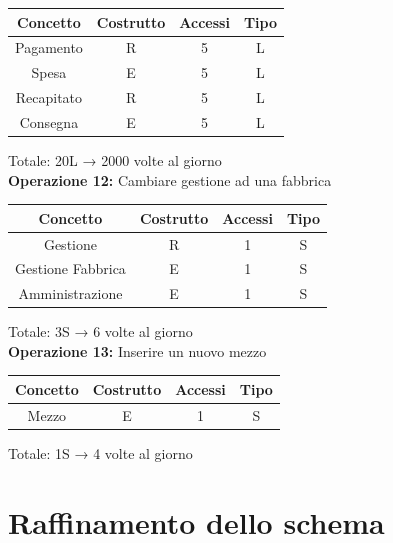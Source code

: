 \documentclass[a4paper,12pt]{report}
\begin{document}
\begin{center}
    \begin{tabular}{ | c   c   c   c | } 
    \hline
	Concetto&Costrutto&Accessi&Tipo\\
	\hline
	Pagamento&R&5&L\\
	\hline
    Spesa&E&5&L\\
	\hline
	Recapitato&R&5&L\\
	\hline
	Consegna&E&5&L\\
	\hline
	\end{tabular}
\end{center}
Totale: 20L → 2000 volte al giorno\\
\textbf{Operazione 12:}
Cambiare gestione ad una fabbrica\\
\begin{center}
    \begin{tabular}{ | c   c   c   c | } 
    \hline
	Concetto&Costrutto&Accessi&Tipo\\
	\hline
	Gestione&R&1&S\\
	\hline
    Gestione Fabbrica&E&1&S\\
	\hline
	Amministrazione&E&1&S\\
	\hline
	\end{tabular}
\end{center}
Totale: 3S → 6 volte al giorno\\
\textbf{Operazione 13:}
Inserire un nuovo mezzo\\
\begin{center}
    \begin{tabular}{ | c   c   c   c | } 
    \hline
	Concetto&Costrutto&Accessi&Tipo\\
	\hline
	Mezzo&E&1&S\\
	\hline
	\end{tabular}
\end{center}
Totale: 1S → 4 volte al giorno\\
\section{Raffinamento dello schema}
\end{document}
